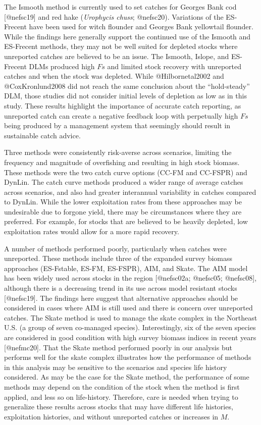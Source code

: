 \documentclass[
]{article}
\begin{document}
The Ismooth method is currently used to set catches for Georges Bank cod {[}@nefsc19{]} and red hake (\emph{Urophycis chuss}; @nefsc20). Variations of the ES-Frecent have been used for witch flounder and Georges Bank yellowtail flounder. While the findings here generally support the continued use of the Ismooth and ES-Frecent methods, they may not be well suited for depleted stocks where unreported catches are believed to be an issue. The Ismooth, Islope, and ES-Frecent DLMs produced high \(Fs\) and limited stock recovery with unreported catches and when the stock was depleted. While @Hilbornetal2002 and @CoxKronlund2008 did not reach the same conclusion about the ``hold-steady'' DLM, those studies did not consider initial levels of depletion as low as in this study. These results highlight the importance of accurate catch reporting, as unreported catch can create a negative feedback loop with perpetually high \(Fs\) being produced by a management system that seemingly should result in sustainable catch advice.

Three methods were consistently risk-averse across scenarios, limiting the frequency and magnitude of overfishing and resulting in high stock biomass. These methods were the two catch curve options (CC-FM and CC-FSPR) and DynLin. The catch curve methods produced a wider range of average catches across scenarios, and also had greater interannual variability in catches compared to DynLin. While the lower exploitation rates from these approaches may be undesirable due to forgone yield, there may be circumstances where they are preferred. For example, for stocks that are believed to be heavily depleted, low exploitation rates would allow for a more rapid recovery.

A number of methods performed poorly, particularly when catches were unreported. These methods include three of the expanded survey biomass approaches (ES-Fstable, ES-FM, ES-FSPR), AIM, and Skate. The AIM model has been widely used across stocks in the region {[}@nefsc02a; @nefsc05; @nefsc08{]}, although there is a decreasing trend in its use across model resistant stocks {[}@nefsc19{]}. The findings here suggest that alternative approaches should be considered in cases where AIM is still used and there is concern over unreported catches. The Skate method is used to manage the skate complex in the Northeast U.S. (a group of seven co-managed species). Interestingly, six of the seven species are considered in good condition with high survey biomass indices in recent years {[}@nefmc20{]}. That the Skate method performed poorly in our analysis but performs well for the skate complex illustrates how the performance of methods in this analysis may be sensitive to the scenarios and species life history considered. As may be the case for the Skate method, the performance of some methods may depend on the condition of the stock when the method is first applied, and less so on life-history. Therefore, care is needed when trying to generalize these results across stocks that may have different life histories, exploitation histories, and without unreported catches or increases in \(M\).
\end{document}
